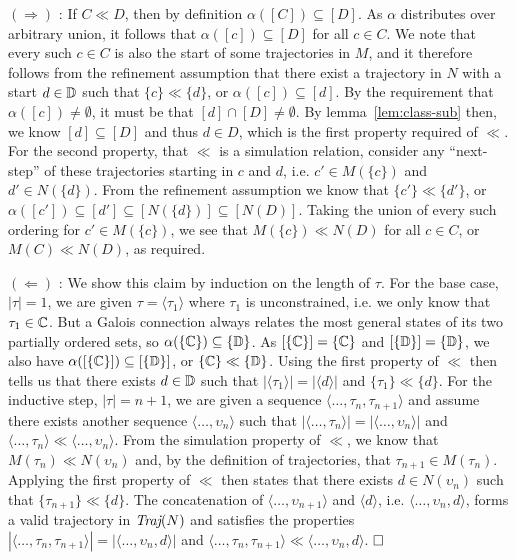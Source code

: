 $(\Rightarrow)$ : If $C \ll D$, then by definition $\alpha([C]) \subseteq [D]$. As $\alpha$ distributes over arbitrary union, it follows that $\alpha([c]) \subseteq [D]$ for all $c \in C$. We note that every such $c \in C$ is also the start of some trajectories in $M$, and it therefore follows from the refinement assumption that there exist a trajectory in $N$ with a start $d \in \mathbb{D}$ such that $\{ c \} \ll \{ d \}$, or $\alpha([c]) \subseteq [d]$. By the requirement that $\alpha([c]) \neq \emptyset$, it must be that $[d] \cap [D] \neq \emptyset$. By lemma~\ref{lem:class-sub} then, we know $[d] \subseteq [D]$ and thus $d \in D$, which is the first property required of $\ll$. For the second property, that $\ll$ is a simulation relation, consider any ``next-step'' of these trajectories starting in $c$ and $d$, i.e. $c' \in M(\{ c \})$ and $d' \in N(\{ d \})$. From the refinement assumption we know that $\{ c' \} \ll \{ d' \}$, or $\alpha([c']) \subseteq [d'] \subseteq [N(\{ d \})] \subseteq [N(D)]$. Taking the union of every such ordering for $c' \in M(\{ c \})$, we see that $M(\{ c \}) \ll N(D)$ for all $c \in C$, or $M(C) \ll N(D)$, as required.



$(\Leftarrow)$ : We show this claim by induction on the length of $\tau$. For the base case, $| \tau | = 1$, we are given $\tau = \langle \tau_{1} \rangle$ where $\tau_{1}$ is unconstrained, i.e. we only know that $\tau_{1} \in \mathbb{C}$. But a Galois connection always relates the most general states of its two partially ordered sets, so $\alpha(\{ \mathbb{C} \}) \subseteq \{ \mathbb{D} \}$. As $[\{ \mathbb{C} \}] = \{ \mathbb{C} \}$ and $[\{ \mathbb{D} \}] = \{ \mathbb{D} \}$, we also have $\alpha([\{ \mathbb{C} \}]) \subseteq [\{ \mathbb{D} \}]$, or $\{ \mathbb{C} \} \ll \{ \mathbb{D} \}$. Using the first property of $\ll$ then tells us that there exists $d \in \mathbb{D}$ such that $|\langle \tau_{1} \rangle| = |\langle d \rangle|$ and $\{ \tau_{1} \} \ll \{ d \}$. For the inductive step, $| \tau | = n + 1$, we are given a sequence $\langle \dots, \tau_{n}, \tau_{n+1} \rangle$ and assume there exists another sequence $\langle \dots, \upsilon_{n} \rangle$ such that $|\langle \dots, \tau_{n} \rangle| = |\langle \dots, \upsilon_{n} \rangle|$ and $\langle \dots, \tau_{n} \rangle \ll \langle \dots, \upsilon_{n} \rangle$. From the simulation property of $\ll$, we know that $M(\tau_{n}) \ll N(\upsilon_{n})$ and, by the definition of trajectories, that $\tau_{n+1} \in M(\tau_{n})$. Applying the first property of $\ll$ then states that there exists $d \in N(\upsilon_{n})$ such that $\{ \tau_{n+1} \} \ll \{ d \}$. The concatenation of $\langle \dots, \upsilon_{n+1} \rangle$ and $\langle d \rangle$, i.e. $\langle \dots, \upsilon_{n}, d \rangle$, forms a valid trajectory in $\operatorname{\textit{Traj}}(N)$ and satisfies the properties $| \langle \dots, \tau_{n}, \tau_{n+1} \rangle | = | \langle \dots, \upsilon_{n}, d \rangle |$ and $\langle \dots, \tau_{n}, \tau_{n+1} \rangle \ll \langle \dots, \upsilon_{n}, d \rangle$. $\qedbox$

